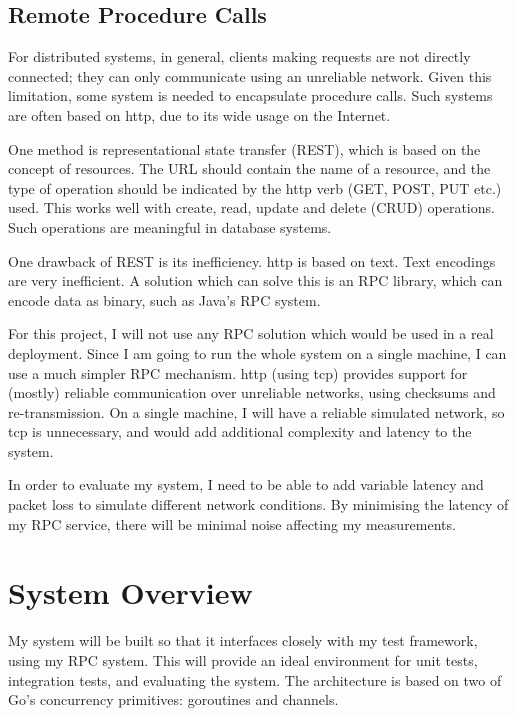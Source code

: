 \documentclass[12pt,a4paper]{article}
\begin{document}

\subsection*{Remote Procedure Calls}

For distributed systems, in general, clients making requests are not directly connected; they can only communicate using an unreliable network. Given this limitation, some system is needed to encapsulate procedure calls. Such systems are often based on http, due to its wide usage on the Internet.

One method is representational state transfer (REST), which is based on the concept of resources. The URL should contain the name of a resource, and the type of operation should be indicated by the http verb (GET, POST, PUT etc.) used. This works well with create, read, update and delete (CRUD) operations. Such operations are meaningful in database systems.


One drawback of REST is its inefficiency. http is based on text. Text encodings are very inefficient. A solution which can solve this is an RPC library, which can encode data as binary, such as Java's RPC system.

For this project, I will not use any RPC solution which would be used in a real deployment. Since I am going to run the whole system on a single machine, I can use a much simpler RPC mechanism. http (using tcp) provides support for (mostly) reliable communication over unreliable networks, using checksums and re-transmission. On a single machine, I will have a reliable simulated network, so tcp is unnecessary, and would add additional complexity and latency to the system.

In order to evaluate my system, I need to be able to add variable latency and packet loss to simulate different network conditions. By minimising the latency of my RPC service, there will be minimal noise affecting my measurements.

\section*{System Overview}

My system will be built so that it interfaces closely with my test framework, using my RPC system. This will provide an ideal environment for unit tests, integration tests, and evaluating the system. The architecture is based on two of Go's concurrency primitives: goroutines and channels.
\end{document}

